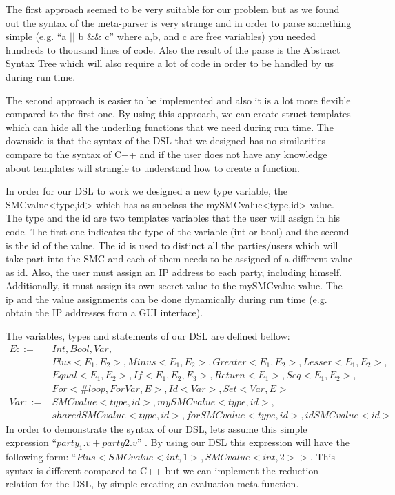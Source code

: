 \documentclass[paper=a4, fontsize=11pt]{scrartcl} %
\numberwithin{equation}{section} %
\numberwithin{figure}{section} %
\numberwithin{table}{section} %
\begin{document}
The first approach seemed to be very suitable for our problem but as we found out the syntax of the meta-parser is very strange and in order to parse something simple (e.g. ``a $||$ b \&\& c'' where a,b, and c are free variables) you needed hundreds to thousand lines of code. Also the result of the parse is the Abstract Syntax Tree which will also require a lot of code in order to be handled by us during run time.

The second approach is easier to be implemented and also it is a lot more flexible compared to the first one. By using this approach, we can create struct templates which can hide all the underling functions that we need during run time. The downside is that the syntax of the DSL that we designed has no similarities compare to the syntax of C++ and if the user does not have any knowledge about templates will strangle to understand how to create a function.

In order for our DSL to work we designed a new type variable, the SMCvalue<type,id> which has as subclass the mySMCvalue<type,id> value. The type and the id are two templates variables that the user will assign in his code. The first one indicates the type of the variable (int or bool) and the second is the id of the value. The id is used to distinct all the parties/users which will take part into the SMC and each of them needs to be assigned of a different value as id. Also, the user must assign an IP address to each party, including himself. Additionally, it must assign its own secret value to the mySMCvalue value. The ip and the value assignments can be done dynamically during run time (e.g. obtain the IP addresses from a GUI interface).

The variables, types and statements of our DSL are defined bellow:
\begin{align*}
E ::=& Int, Bool, Var,\\
&Plus<E_1,E_2>, Minus<E_1,E_2>, Greater<E_1,E_2>, Lesser<E_1,E_2>,\\ &Equal<E_1,E_2>,If<E_1,E_2,E_3>, Return<E_1>, Seq<E_1,E_2>,\\
&For<\#loop, ForVar, E>, Id<Var>, Set<Var, E>\\
Var::=& SMCvalue<type,id>, mySMCvalue<type,id>,\\
& sharedSMCvalue<type,id>, forSMCvalue<type, id>, idSMCvalue<id>
\end{align*}
In order to demonstrate the syntax of our DSL, lets assume this simple expression ``$party_1.v + party2.v$'' . By using our DSL this expression will have the following form: ``$Plus<SMCvalue<int,1>, SMCvalue<int,2> >$. This syntax is different compared to C++ but we can implement the reduction relation for the DSL, by simple creating an evaluation meta-function.
\end{document}
